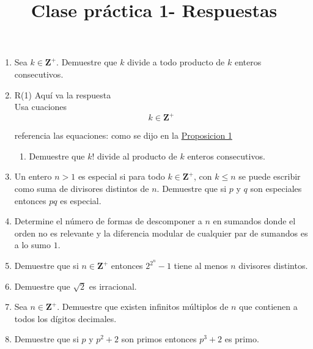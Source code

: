 \documentclass{article}
\begin{document}
\title{Clase pr\'actica 1- Respuestas}
\maketitle

\begin{enumerate}
    \item Sea $k \in \mathbf{Z^+}$. Demuestre que $k$ divide a todo producto de $k$ enteros consecutivos. 
    \item[]  R(1) Aquí va la respuesta  \\

        Usa cuaciones
        \begin{equation}
            k \in \mathbf{Z^+}
        \end{equation}\label{eq:1}

        referencia las equaciones: como se dijo en la \href{1}{Proposicion 1}
    \begin{enumerate}
        \item Demuestre que $k!$ divide al producto de $k$ enteros consecutivos.
    \end{enumerate}
    \item Un entero $n>1$ es especial si para todo $k \in \mathbf{Z^+}$, con $k \leq n$ se puede escribir como suma de divisores distintos de $n$. Demuestre que si $p$ y $q$ son especiales entonces $pq$ es especial.
    \item Determine el n\'umero de formas de descomponer a $n$ en sumandos donde el orden no es relevante y la diferencia modular de cualquier par de sumandos es a lo sumo $1$.
    \item Demuestre que si $n \in \mathbf{Z^+}$ entonces $2^{2^n} - 1$ tiene al menos $n$ divisores distintos.
    \item Demuestre que $\sqrt{2}$ es irracional.
    \item Sea  $n \in \mathbf{Z^+}$. Demuestre que existen infinitos m\'ultiplos de $n$ que contienen a todos los d\'igitos decimales.
    \item Demuestre que si $p$ y $p^2+2$ son primos entonces $p^3+2$ es primo.
\end{enumerate}
\end{document}
